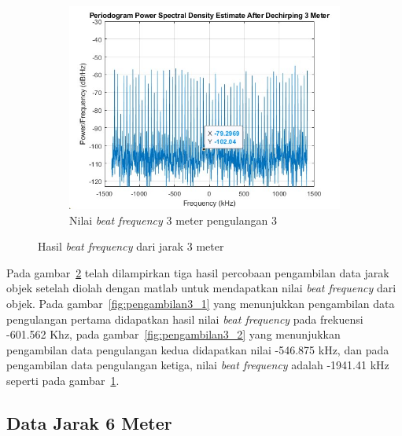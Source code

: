 \begin{figure}
    \begin{subfigure}[b]{0.6\textwidth}
        \centering
        \includegraphics[scale=0.35]{pics/bab5/Range/3_3.jpg}
        \caption{Nilai \textit{beat frequency} 3 meter pengulangan 3}
        \label{fig:pengambilan3_3}
    \end{subfigure}
    \caption{Hasil \textit{beat frequency} dari jarak 3 meter}
    \label{fig:pengambilan3}
\end{figure}

Pada gambar~\ref{fig:pengambilan3} telah dilampirkan tiga hasil percobaan pengambilan data jarak objek setelah diolah dengan matlab untuk mendapatkan nilai \textit{beat frequency} dari objek. Pada gambar~\ref{fig:pengambilan3_1} yang menunjukkan pengambilan data pengulangan pertama didapatkan hasil nilai \textit{beat frequency} pada frekuensi -601.562 Khz, pada gambar~\ref{fig:pengambilan3_2} yang menunjukkan pengambilan data pengulangan kedua didapatkan nilai -546.875 kHz, dan pada pengambilan data pengulangan ketiga, nilai \textit{beat frequency} adalah -1941.41 kHz seperti pada gambar~\ref{fig:pengambilan3_3}.

\subsection{Data Jarak 6 Meter}

